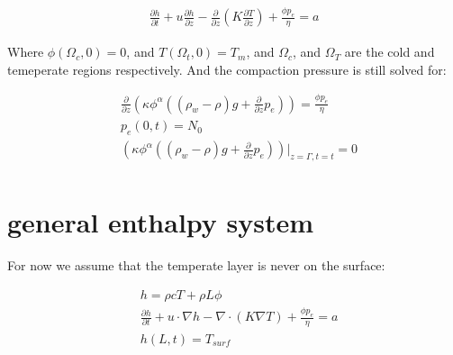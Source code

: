 \documentclass[a4paper,12pt]{article}
\newcommand{\pd}[2]{\frac{\partial #1}{\partial #2}}
\begin{document}
\begin{align*}
\pd{h}{t} + u \pd{h}{z} - \pd{}{z}\left(K \pd{T}{z}\right) + \frac{\phi p_e}{\eta} = a
\end{align*}

Where $\phi(\Omega_c, 0) = 0$, and $T(\Omega_t, 0) = T_m$, and $\Omega_c$, and $\Omega_T$ are the cold and temeperate regions respectively. And the compaction pressure is still solved for:

\begin{align}
  &\pd{}{z}\left(\kappa\phi^\alpha\left((\rho_w - \rho)g + \pd{}{z}p_e\right)\right) = \frac{\phi p_e}{\eta} \label{eq:pe-equation}\\
  &p_e(0,t) = N_0\\
  &\left(\kappa \phi^\alpha\left( (\rho_w - \rho)g + \pd{}{z} p_e\right)\right)\bigg\rvert_{z=\Gamma, t=t} = 0\\
\end{align}

\section{general enthalpy system}

For now we assume that the temperate layer is never on the surface:

\begin{align*}
  &h = \rho c T + \rho L \phi\\
  &\pd{h}{t} + u \cdot \nabla h - \nabla \cdot \left(K \nabla T\right) + \frac{\phi p_e}{\eta} = a\\
  &h(L, t) = T_{surf}\\
\end{align*}
\end{document}
